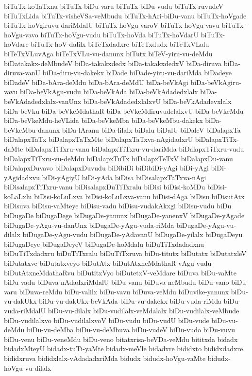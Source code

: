 {biTuTx-koTaTxnu
biTuTx-biDu-varu
biTuTx-biDu-vudu
biTuTx-ruvudeV
biTuTxLida
biTuTx-visheVSa-veMbudu
biTuTx-hAri-biDu-vanu
biTuTx-hoVgade
biTuTx-hoVgiruvu-dariMdalU
biTuTx-hoVgu-varoV
biTuTx-hoVgu-vavu
biTuTx-hoVgu-vavo
biTuTx-hoVgu-vudu
biTuTx-hoVda
biTuTx-hoVdarU
biTuTx-hoVdare
biTuTx-hoV-dalilx
biTeTxdadxre
biTeTxdudx
biTeTxVLalu
biTeTxVLuvAga
biTeTxVLu-vu-danunx
biTutx
biTeV-yiru-vu-deMdu
biDatakakx-deMbudeV
biDa-takakxdedx
biDa-takakxdedxV
biDa-diruva
biDa-diruva-vanU
biDa-diru-vu-dakekx
biDade
biDade-yiru-vu-dariMda
biDadeye
biDadeV
biDa-bAra-deMdu
biDa-bAra-deMdU
biDa-beVkAgi
biDa-beVkAgiru-vavu
biDa-beVkAgu-vudu
biDa-beVkAda
biDa-beVkAdadedxlalx
biDa-beVkAdadedxlalx-vanUnx
biDa-beVkAdadedxlalxvU
biDa-beVkAdadevxlalx
biDa-beVku
biDa-beVkeMdathaR
biDa-beVkeMdiruvudelalxvU
biDa-beVkeMdu
biDa-beVkeMdu-heVLida
biDa-beVkeMba
biDa-beVkeMbu-dakekx
biDa-beVkeMbu-danunx
biDa-lAranu
biDa-lilalx
biDalu
biDalU
biDaleV
biDalapxTa
biDalapxTaTx
biDalapxTaTxMte
biDalapxTaTxva-nAgidadxrU
biDalapxTiTx-daMte
biDalapxTiTxru-vanu
biDalapxTiTxru-vu-dariMda
biDalapxTiTxru-vudu
biDalapxTiTxru-vu-deMdu
biDalapxTuTx
biDalapxTeTxV
biDalapxDu-vanu
biDalapxDuvavo
biDalapxDuvudu
biDibiDi
biDibiDi-yAgi
biDi-yAgi
biDi-yAgidadxvu
biDi-yAgiyU
biDi-yAda
biDisa
biDisalapxTaTxva-nAgi
biDisalapxTiTxru-vanu
biDisalapxDuTiTxralu
biDisi
biDisi-koMDu
biDisi-koLaLxlu
biDisi-koLuLxva
biDisi-koLuLxva-vanu
biDisi-dAga
biDisu
biDisutAtx
biDisuva
biDisu-vaMteye
biDisu-vadu
biDisu-vudakAkxgi
biDisu-vudu
biDu
biDugaDe
biDugaDege
biDugaDe-yanunx
biDugaDe-yanenxV
biDugaDe-yAgade
biDugaDe-yAgu-vu-danUnx
biDugaDe-yAgu-vuda-riMda
biDugaDe-yAgu-vu-dilalx
biDugaDe-yAgu-vudu
biDugaDe-yAdavanU
biDugaDe-yilalx
biDugaDeyu
biDugaDeye
biDugaDeyeV
biDugaDe-hoMdalu
biDuTiTxdadadxnu
biDuTiTxdadxru
biDuTiTxralu
biDuTiTxruva
biDu-titutx
biDutatx
biDutatxleV
biDutatxve
biDutatxveyo
biDutAtx
biDutAtxneMdathaR-vAgu-vudu
biDutAtxneMdathaRvu
biDutitxVyo
biDutetxV-veMdare
biDuva
biDu-vaMte
biDu-vadu
biDuva-nAdadxriMdalU
biDu-vanu
biDuva-neMbudu
biDu-vano
biDu-varu
biDuva-reMdu
biDu-valilx
biDu-vavu
biDuva-veMdu
biDuvike-yanunx
biDu-vu-dakUkx
biDu-vu-dakUkx-beVkAda
biDu-vu-dakekx
biDu-vuda-riMda
biDu-vuda-riMdalU
biDu-vu-dilalx
biDu-vudilalx-veMdalalx
biDu-vudilalx-veMbude
biDu-vudilalxvo
biDu-vudilalxvoV
biDu-vudu
biDu-vudU
biDu-vude
biDu-vu-deMdu
biDu-vu-deMba
biDu-vu-deMbuva
biDu-vudeV
biDu-vudo
biDu-vuvu
biDu-venu
biDu-veneMdu
biDu-veno
bitatxrisa-beVDa-veMdu
bititxda
bidadx
bidadxMteyU
bidadx-tuTi-yaMte
bidadx-meVle
bidadxre
bididxto
bididxdadxre
bididxruva
bididxlalx-vAdadadxriMda
bidudx
bidudx-hoVgu-vaMte
bidudx-hoVgu-vu-dilalx
}
